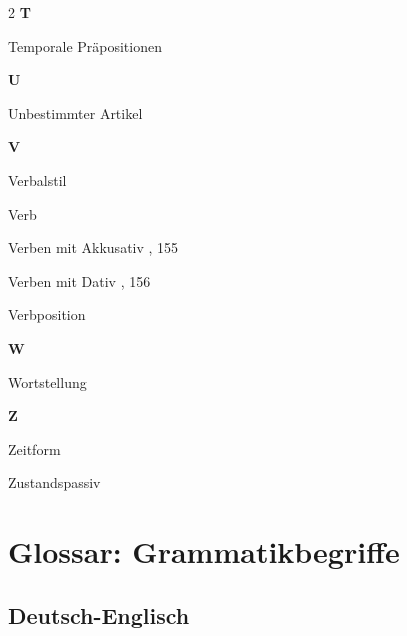 \begin{center}
\begin{multicols}{2}
\textbf{T}
\item Temporale Präpositionen  

\textbf{U}
\item Unbestimmter Artikel  

\textbf{V}
\item Verbalstil  
\item Verb  
\item Verben mit Akkusativ  , 155
\item Verben mit Dativ  , 156
\item Verbposition  

\textbf{W}
\item Wortstellung  

\textbf{Z}
\item Zeitform  
\item Zustandspassiv  

\end{multicols}
\end{center}

\chapterend

\chapter{Glossar: Grammatikbegriffe}
\label{cha:Glossar}

\section{Deutsch-Englisch}

